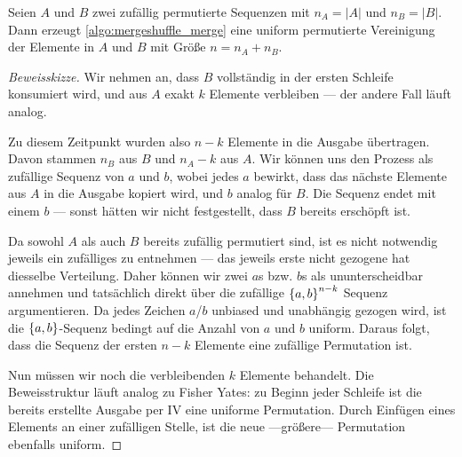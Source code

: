     \begin{theorem}
        Seien $A$ und $B$ zwei zufällig permutierte Sequenzen mit $n_A = |A|$ und $n_B = |B|$.
        Dann erzeugt \cref{algo:mergeshuffle_merge} eine uniform permutierte Vereinigung der Elemente in $A$ und $B$ mit Größe $n = n_A + n_B$.
    \end{theorem}

    \begin{proof}[Beweisskizze]
        Wir nehmen an, dass $B$ vollständig in der ersten Schleife konsumiert wird, und aus $A$ exakt $k$ Elemente verbleiben --- der andere Fall läuft analog.

        Zu diesem Zeitpunkt wurden also $n-k$ Elemente in die Ausgabe übertragen.
        Davon stammen $n_B$ aus $B$ und $n_A - k$ aus $A$.
        Wir können uns den Prozess als zufällige Sequenz von $a$ und $b$, wobei jedes $a$ bewirkt, dass das nächste Elemente aus $A$ in die Ausgabe kopiert wird, und $b$ analog für $B$.
        Die Sequenz endet mit einem $b$ --- sonst hätten wir nicht festgestellt, dass $B$ bereits erschöpft ist.

        Da sowohl $A$ als auch $B$ bereits zufällig permutiert sind, ist es nicht notwendig jeweils ein zufälliges zu entnehmen --- das jeweils erste nicht gezogene hat diesselbe Verteilung.
        Daher können wir zwei $a$s bzw. $b$s als ununterscheidbar annehmen und tatsächlich direkt über die zufällige $\left\{a,b\right\}^{n-k}$ Sequenz argumentieren.
        Da jedes Zeichen $a$/$b$ unbiased und unabhängig gezogen wird, ist die $\left\{a,b\right\}$-Sequenz bedingt auf die Anzahl von $a$ und $b$ uniform.
        Daraus folgt, dass die Sequenz der ersten $n - k$ Elemente eine zufällige Permutation ist.

        Nun müssen wir noch die verbleibenden $k$ Elemente behandelt.
        Die Beweisstruktur läuft analog zu Fisher Yates:
        zu Beginn jeder Schleife ist die bereits erstellte Ausgabe per IV eine uniforme Permutation.
        Durch Einfügen eines Elements an einer zufälligen Stelle, ist die neue ---größere--- Permutation ebenfalls uniform.
    \end{proof}
\fi